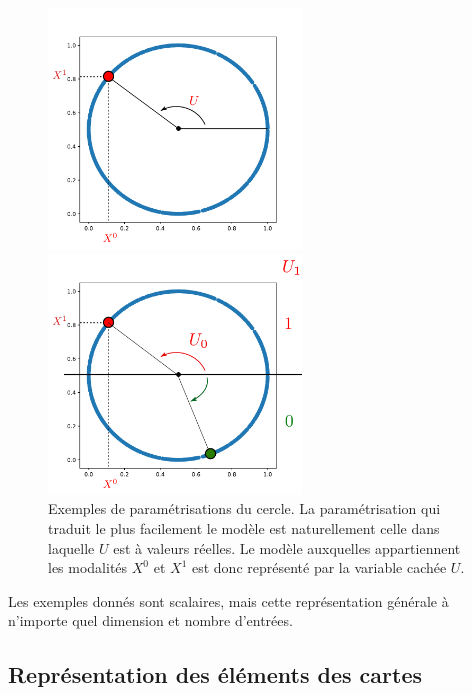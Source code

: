 \begin{figure}
\begin{minipage}{0.5\textwidth}
\centering
\includegraphics[width=0.6\textwidth]{cercle.pdf}
\end{minipage}
\begin{minipage}{0.5\textwidth}
\centering
\includegraphics[width=0.6\textwidth]{cercle_2.pdf}
\end{minipage}
\label{fig:U}
\caption{Exemples de paramétrisations du cercle. La paramétrisation qui traduit le plus facilement le modèle est naturellement celle dans laquelle $U$ est à valeurs réelles. Le modèle auxquelles appartiennent les modalités $X^0$ et $X^1$ est donc représenté par la variable cachée $U$.}
\end{figure}

Les exemples donnés sont scalaires, mais cette représentation générale à n'importe quel dimension et nombre d'entrées.

\subsection{Représentation des éléments des cartes}

